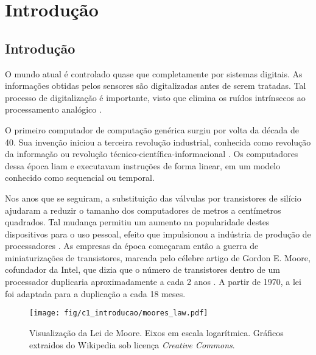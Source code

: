 \documentclass[11pt,a4paper,oneside]{book}
\begin{document}
	\frontmatter
	\listoftodos
	\mainmatter
	
\fi

\chapter{Introdu\c{c}\~ao}\label{CapIntro}


\section{Introdu\c{c}\~ao} 
O mundo atual \'e controlado quase que completamente por sistemas digitais.
As informa\c{c}\~oes obtidas pelos sensores s\~ao digitalizadas antes de serem tratadas.
Tal processo de digitaliza\c{c}\~ao \'e importante, visto que elimina os ru\'idos intr\'insecos ao processamento anal\'ogico \cite{chen2004electrical}.

O primeiro computador de computa\c{c}\~ao gen\'erica surgiu por volta da d\'ecada de 40.
Sua inven\c{c}\~ao iniciou a terceira revolu\c{c}\~ao industrial, conhecida como revolu\c{c}\~ao da informa\c{c}\~ao ou revolu\c{c}\~ao t\'ecnico-cient\'ifica-informacional \cite{patterson2005coa}.
Os computadores dessa \'epoca liam e executavam instru\c{c}\~oes de forma linear, em um modelo conhecido como sequencial ou temporal. 

Nos anos que se seguiram, a substituição das válvulas por transistores de sil\'icio ajudaram a reduzir o tamanho dos computadores de metros a cent\'imetros quadrados.
Tal mudan\c{c}a permitiu um aumento na popularidade destes dispositivos para o uso pessoal, efeito que impulsionou a ind\'ustria de produ\c{c}\~ao de processadores \cite{Hennessy2011}.
As empresas da \'epoca come\c{c}aram ent\~ao a guerra de miniaturiza\c{c}\~oes de transistores, marcada pelo c\'elebre artigo de Gordon E. Moore, cofundador da Intel, que dizia que o n\'umero de transistores dentro de um processador duplicaria aproximadamente a cada 2 anos \cite{Moore1965}.
A partir de 1970, a lei foi adaptada para a duplica\c{c}\~ao a cada 18 meses.

\begin{figure}[h]
	\centering
	\texttt{[image: fig/c1\_introducao/moores\_law.pdf]}
	\caption{Visualização da Lei de Moore. Eixos em escala logarítmica. Gráficos extraidos do Wikipedia sob licença \textit{Creative Commons}.}
	\label{fig:moores_law}
\end{figure}
\end{document}
